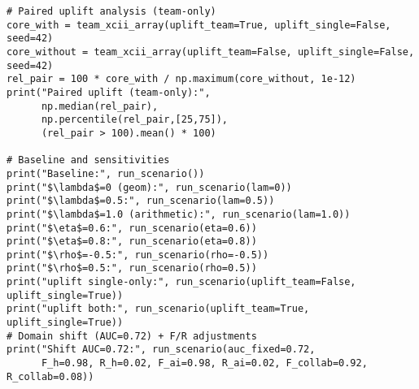 \documentclass[11pt,a4paper]{article}
\begin{document}
\begin{lstlisting}
# Paired uplift analysis (team-only)
core_with = team_xcii_array(uplift_team=True, uplift_single=False, seed=42)
core_without = team_xcii_array(uplift_team=False, uplift_single=False, seed=42)
rel_pair = 100 * core_with / np.maximum(core_without, 1e-12)
print("Paired uplift (team-only):",
      np.median(rel_pair),
      np.percentile(rel_pair,[25,75]),
      (rel_pair > 100).mean() * 100)

# Baseline and sensitivities
print("Baseline:", run_scenario())
print("$\lambda$=0 (geom):", run_scenario(lam=0))
print("$\lambda$=0.5:", run_scenario(lam=0.5))
print("$\lambda$=1.0 (arithmetic):", run_scenario(lam=1.0))
print("$\eta$=0.6:", run_scenario(eta=0.6))
print("$\eta$=0.8:", run_scenario(eta=0.8))
print("$\rho$=-0.5:", run_scenario(rho=-0.5))
print("$\rho$=0.5:", run_scenario(rho=0.5))
print("uplift single-only:", run_scenario(uplift_team=False, uplift_single=True))
print("uplift both:", run_scenario(uplift_team=True, uplift_single=True))
# Domain shift (AUC=0.72) + F/R adjustments
print("Shift AUC=0.72:", run_scenario(auc_fixed=0.72,
      F_h=0.98, R_h=0.02, F_ai=0.98, R_ai=0.02, F_collab=0.92, R_collab=0.08))
\end{lstlisting}
\end{document}
